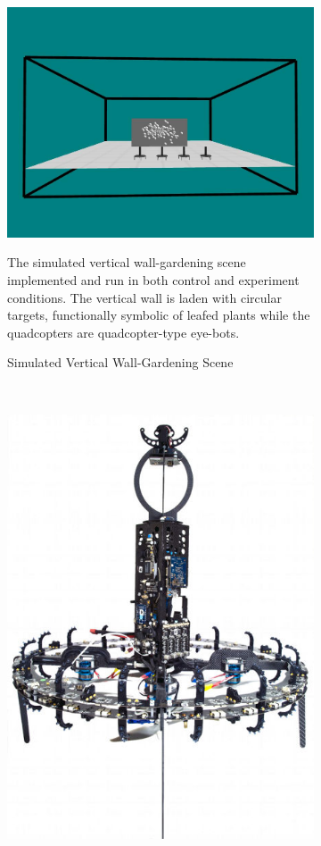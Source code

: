 \documentclass{report}
\begin{document}
\newpage
\begin{figure}
	\begin{subfigure}[b]{0.6\textwidth}
		\centering
		\includegraphics[width=\textwidth]{images/VerticalWallGardeningScene}
		\caption{Simulated Vertical Wall-Gardening Scene}
		\label{fig:sim_orig_scene}
		{The simulated vertical wall-gardening scene implemented and run in both control and experiment 	conditions. The vertical wall is laden with circular targets, functionally symbolic of leafed plants while the quadcopters are quadcopter-type eye-bots}.
	\end{subfigure}
	~
	\begin{subfigure}[b]{0.4\textwidth}
		\centering
		\includegraphics[width=\textwidth]{images/EyebotCarbonFrame}

\end{subfigure}
\end{figure}
\end{document}
